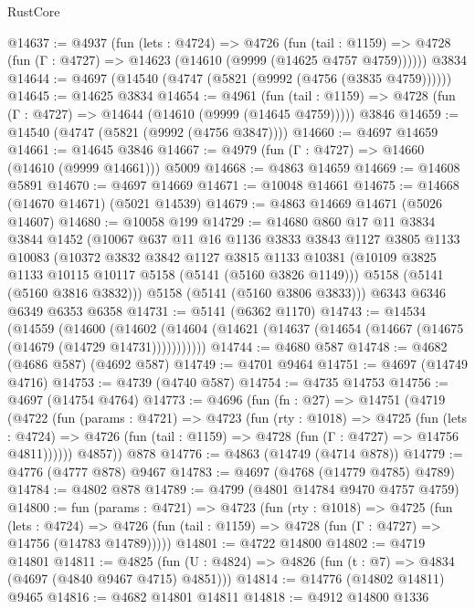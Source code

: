\begin{lexlean}{RustCore}
\begin{coremodule}
@14637 := @4937
    (fun (lets : @4724) =>
    @4726
      (fun (tail : @1159) =>
      @4728 (fun (Γ : @4727) => @14623 (@14610 (@9999 (@14625 @4757 @4759))))))
    @3834
@14644 := @4697 (@14540 (@4747 (@5821 (@9992 (@4756 (@3835 @4759))))))
@14645 := @14625 @3834
@14654 := @4961
    (fun (tail : @1159) => @4728 (fun (Γ : @4727) => @14644 (@14610 (@9999 (@14645 @4759)))))
    @3846
@14659 := @14540 (@4747 (@5821 (@9992 (@4756 @3847))))
@14660 := @4697 @14659
@14661 := @14645 @3846
@14667 := @4979 (fun (Γ : @4727) => @14660 (@14610 (@9999 @14661))) @5009
@14668 := @4863 @14659
@14669 := @14608 @5891
@14670 := @4697 @14669
@14671 := @10048 @14661
@14675 := @14668 (@14670 @14671) (@5021 @14539)
@14679 := @4863 @14669 @14671 (@5026 @14607)
@14680 := @10058 @199
@14729 := @14680
    @860
    @17
    @11
    @3834
    @3844
    @1452
    (@10067
      @637
      @11
      @16
      @1136
      @3833
      @3843
      @1127
      @3805
      @1133
      @10083
      (@10372
        @3832
        @3842
        @1127
        @3815
        @1133
        @10381
        (@10109 @3825 @1133 @10115 @10117 @5158 (@5141 (@5160 @3826 @1149)))
        @5158
        (@5141 (@5160 @3816 @3832)))
      @5158
      (@5141 (@5160 @3806 @3833)))
    @6343
    @6346
    @6349
    @6353
    @6358
@14731 := @5141 (@6362 @1170)
@14743 := @14534
    (@14559
      (@14600
        (@14602 (@14604 (@14621 (@14637 (@14654 (@14667 (@14675 (@14679 (@14729 @14731)))))))))))
@14744 := @4680 @587
@14748 := @4682 (@4686 @587) (@4692 @587)
@14749 := @4701 @9464
@14751 := @4697 (@14749 @4716)
@14753 := @4739 (@4740 @587)
@14754 := @4735 @14753
@14756 := @4697 (@14754 @4764)
@14773 := @4696
    (fun (fn : @27) =>
    @14751
      (@4719
        (@4722
          (fun (params : @4721) =>
          @4723
            (fun (rty : @1018) =>
            @4725
              (fun (lets : @4724) =>
              @4726 (fun (tail : @1159) => @4728 (fun (Γ : @4727) => @14756 @4811))))))
        @4857))
    @878
@14776 := @4863 (@14749 (@4714 @878))
@14779 := @4776 (@4777 @878) @9467
@14783 := @4697 (@4768 (@14779 @4785) @4789)
@14784 := @4802 @878
@14789 := @4799 (@4801 @14784 @9470 @4757 @4759)
@14800 := fun (params : @4721) =>
  @4723
    (fun (rty : @1018) =>
    @4725
      (fun (lets : @4724) =>
      @4726 (fun (tail : @1159) => @4728 (fun (Γ : @4727) => @14756 (@14783 @14789)))))
@14801 := @4722 @14800
@14802 := @4719 @14801
@14811 := @4825 (fun (U : @4824) => @4826 (fun (t : @7) => @4834 (@4697 (@4840 @9467 @4715) @4851)))
@14814 := @14776 (@14802 @14811) @9465
@14816 := @4682 @14801 @14811
@14818 := @4912 @14800 @1336

\end{coremodule}
\end{lexlean}
